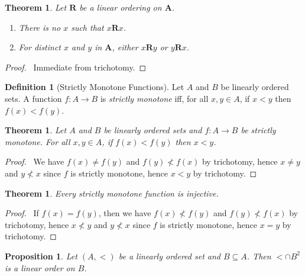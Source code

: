 \documentclass{article}
\let\qed\relax
\newtheorem{proposition}[axiom]{Proposition}
\newtheorem{theorem}[axiom]{Theorem}
\theoremstyle{definition}
\newtheorem{definition}[axiom]{Definition}
\begin{document}
    \begin{theorem}
        Let $\mathbf{R}$ be a linear ordering on $\mathbf{A}$.
        \begin{enumerate}
            \item There is no $x$ such that $x \mathbf{R} x$.
            \item For distinct $x$ and $y$ in $\mathbf{A}$, either $x\mathbf{R}y$ or $y\mathbf{R}x$.
        \end{enumerate}
    \end{theorem}

    \begin{proof}
        \pf\ Immediate from trichotomy. \qed
    \end{proof}

    \begin{definition}[Strictly Monotone Functions]
        Let $A$ and $B$ be linearly ordered sets. A function $f : A \rightarrow B$ is \emph{strictly
        monotone} iff, for all $x, y \in A$, if $x < y$ then $f(x) < f(y)$.
    \end{definition}

    \begin{theorem}
        Let $A$ and $B$ be linearly ordered sets and $f : A \rightarrow B$ be strictly monotone.
        For all $x, y \in A$, if $f(x) < f(y)$ then $x < y$.
    \end{theorem}

    \begin{proof}
        \pf\ We have $f(x) \neq f(y)$ and $f(y) \not < f(x)$ by trichotomy, hence $x \neq y$ and $y \not < x$
        since $f$ is strictly monotone, hence $x < y$ by trichotomy. \qed
    \end{proof}

    \begin{theorem}
        Every strictly monotone function is injective.
    \end{theorem}

    \begin{proof}
        \pf\ If $f(x) = f(y)$, then we have $f(x) \not < f(y)$ and $f(y) \not < f(x)$ by trichotomy,
        hence $x \not < y$ and $y \not < x$ since $f$ is strictly monotone, hence $x = y$ by
        trichotomy. \qed
    \end{proof}

    \begin{proposition}
        Let $(A, <)$ be a linearly ordered set and $B \subseteq A$. Then $< \cap B^2$ is a linear order on $B$.
    \end{proposition}
\end{document}
